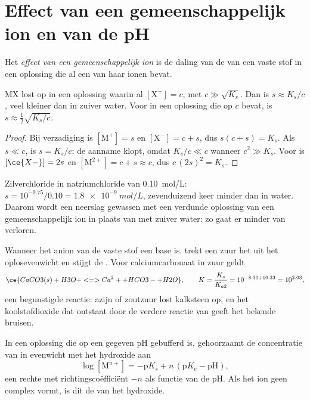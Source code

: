 \section{Effect van een gemeenschappelijk ion en van de pH}

\begin{definition}\label{def:b1:precipitation:common-ion}
Het \emph{effect van een gemeenschappelijk ion}
is de daling van de  van een vaste stof in een oplossing die
al een van haar ionen bevat.
\end{definition}

\begin{proposition}\label{prop:b1:precipitation:common-ion}
MX lost op in een oplossing waarin al $[\mathrm{X}^-] = c$, met
$c \gg \sqrt{K_s}$. Dan is $s \approx K_s/c$, veel kleiner dan in zuiver
water. Voor  in een oplossing die  op $c$ bevat, is
$s \approx \frac12\sqrt{K_s/c}$.
\end{proposition}

\begin{proof}
Bij verzadiging is $[\mathrm{M}^+] = s$ en $[\mathrm{X}^-] = c + s$, dus
$s(c + s) = K_s$. Als $s \ll c$, is $s = K_s/c$; de aanname klopt, omdat
$K_s/c \ll c$ wanneer $c^2 \gg K_s$. Voor  is $[\ce{X-}] = 2s$ en
$[\mathrm{M}^{2+}] = c + s \approx c$, dus $c\,(2s)^2 = K_s$.
\end{proof}

Zilverchloride in natriumchloride van \qty{0.10}{mol/L}: $s = 10^{-9.75}/0.10
= \qty{1.8e-9}{mol/L}$, zevenduizend keer minder dan in water. Daarom
wordt een neerslag gewassen met een verdunde oplossing van een
gemeenschappelijk ion in plaats van met zuiver water: zo gaat er minder
van verloren.

Wanneer het anion van de vaste stof een base is, trekt een zuur het uit
het oplosevenwicht en stijgt de . Voor calciumcarbonaat in
zuur geldt
\[
  \ce{CaCO3(s) + H3O+ <=> Ca^2+ + HCO3- + H2O}, \qquad
  K = \frac{K_s}{K_{a2}} = 10^{-8.30 + 10.33} = 10^{2.03} ,
\]
een begunstigde reactie: azijn of zoutzuur lost kalksteen op, en het
koolstofdioxide dat ontstaat door de verdere reactie van
 geeft het bekende bruisen.


\begin{proposition}\label{prop:b1:precipitation:hydroxide-ph}
In een oplossing die op een gegeven pH gebufferd is, gehoorzaamt de
concentratie van  in evenwicht met het hydroxide
 aan
\[
  \log[\mathrm{M}^{n+}] = -\mathrm{p}K_s + n\,(\mathrm{p}K_e - \mathrm{pH}) ,
\]
een rechte met richtingscoëfficiënt $-n$ als functie van de pH. Als het
ion geen complex vormt, is dit de  van het hydroxide.
\end{proposition}

